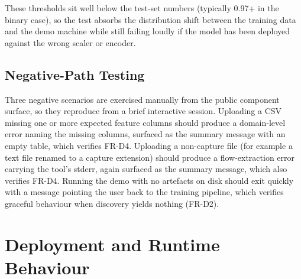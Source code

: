 \par These thresholds sit well below the test-set numbers (typically 0.97+ in the binary case), so the test absorbs the distribution shift between the training data and the demo machine while still failing loudly if the model has been deployed against the wrong scaler or encoder.

\subsection{Negative-Path Testing}
\label{subsec:negative_path_testing}

\par Three negative scenarios are exercised manually from the public component surface, so they reproduce from a brief interactive session. Uploading a CSV missing one or more expected feature columns should produce a domain-level error naming the missing columns, surfaced as the summary message with an empty table, which verifies FR-D4. Uploading a non-capture file (for example a text file renamed to a capture extension) should produce a flow-extraction error carrying the tool's stderr, again surfaced as the summary message, which also verifies FR-D4. Running the demo with no artefacts on disk should exit quickly with a message pointing the user back to the training pipeline, which verifies graceful behaviour when discovery yields nothing (FR-D2).

\section{Deployment and Runtime Behaviour}
\label{sec:deployment_runtime}

